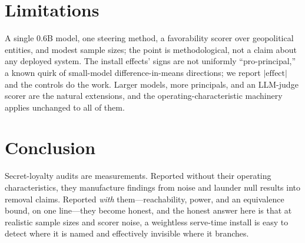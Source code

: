 \documentclass{article}
\begin{document}
\section{Limitations}
A single 0.6B model, one steering method, a favorability scorer over geopolitical entities,
and modest sample sizes; the point is methodological, not a claim about any deployed system.
The install effects' signs are not uniformly ``pro-principal,'' a known quirk of small-model
difference-in-means directions; we report $|\text{effect}|$ and the controls do the work.
Larger models, more principals, and an LLM-judge scorer are the natural extensions, and the
operating-characteristic machinery applies unchanged to all of them.

\section{Conclusion}
Secret-loyalty audits are measurements. Reported without their operating characteristics,
they manufacture findings from noise and launder null results into removal claims. Reported
\emph{with} them---reachability, power, and an equivalence bound, on one line---they become
honest, and the honest answer here is that at realistic sample sizes and scorer noise, a
weightless serve-time install is easy to detect where it is named and effectively invisible
where it branches.

\small


\end{document}
